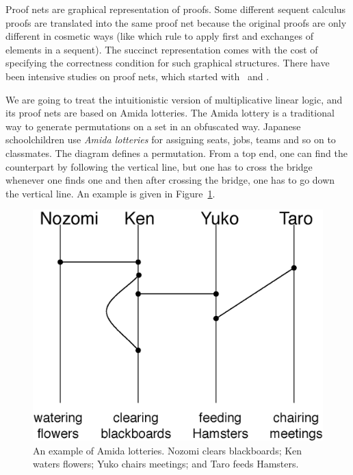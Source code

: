 Proof nets are graphical representation of proofs.
Some different sequent calculus proofs are translated into the same
proof net because the original proofs are only different in cosmetic
ways (like which rule to apply first and exchanges of elements in a
sequent).
The succinct representation comes with the cost of specifying
the correctness condition for such graphical structures.
There have been intensive studies on proof nets,
which started with~\citet{girard1987} and \citet{danos-regnier}.

 We are going to treat the intuitionistic version of
 multiplicative linear logic, and its proof nets are based on Amida
 lotteries.
 The Amida lottery is a traditional way to generate permutations on a set
 in an obfuscated way.
 Japanese schoolchildren use \textit{Amida lotteries}
 for assigning seats, jobs, teams and so on to classmates.
 The diagram defines a permutation.
 From a top end, one can find the counterpart by following the vertical
 line, but one has to cross the bridge whenever one finds one and then
 after crossing the bridge, one has to go down the vertical line.
 An example is given in Figure~\ref{amida-lottery}.

 \begin{figure}[h]
  \centering
  \includegraphics[scale=0.6]{amida.eps}
  \caption[An example of Amida lotteries.]{An example of Amida
  lotteries.  Nozomi clears blackboards; Ken waters flowers; Yuko chairs
  meetings; and Taro feeds Hamsters.}
  \label{amida-lottery}
 \end{figure}


